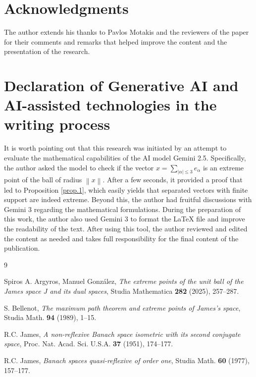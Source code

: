 \documentclass[11pt,a4paper]{amsart}
\newcommand{\norm}[1]{\left\lVert#1\right\rVert}
\newcommand{\J}{J}
\begin{document}
\section*{Acknowledgments}
The author extends his thanks to Pavlos Motakis and the reviewers of the paper for their comments and remarks that helped improve the content and the presentation of the research.

\section*{Declaration of Generative AI and AI-assisted technologies in the writing process}
It is worth pointing out that this research was initiated by an attempt to evaluate the mathematical capabilities of the AI model Gemini 2.5. Specifically, the author asked the model to check if the vector $x = \sum _{|\alpha |\le 3 }e_{\alpha}$ is an extreme point of the ball of radius $\norm{x}$. After a few seconds, it provided a proof that led to Proposition \ref{prop.1}, which easily yields that separated vectors with finite support are indeed extreme. Beyond this, the author had fruitful discussions with Gemini 3 regarding the mathematical formulations. During the preparation of this work, the author also used Gemini 3 to format the LaTeX file and improve the readability of the text. After using this tool, the author reviewed and edited the content as needed and takes full responsibility for the final content of the publication.

\begin{thebibliography}{9}

    Spiros A. Argyros, Manuel González,
    \textit{The extreme points of the unit ball of the James space $\J$ and its dual spaces},
    Studia Mathematica \textbf{282} (2025), 257--287.

     S. Bellenot, 
    \textit{The maximum path theorem and extreme points of James's space}, 
    Studia Math. \textbf{94} (1989), 1--15.

     R.C. James, 
    \textit{A non-reflexive Banach space isometric with its second conjugate space}, 
    Proc. Nat. Acad. Sci. U.S.A. \textbf{37} (1951), 174--177.

     R.C. James, 
    \textit{Banach spaces quasi-reflexive of order one}, 
    Studia Math. \textbf{60} (1977), 157--177.

\end{thebibliography}
\end{document}
